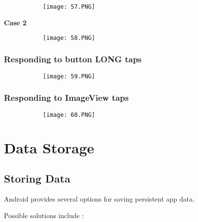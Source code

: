 \documentclass{article}
\begin{document}
  \begin{figure}[ht!]
  \centering
  \begin{subfigure}[b]{0.8\linewidth}
  \texttt{[image: 57.PNG]}
  \end{subfigure}
  \end{figure}

  
  \textbf{Case 2}

    \begin{figure}[ht!]
  \centering
  \begin{subfigure}[b]{0.8\linewidth}
  \texttt{[image: 58.PNG]}
  \end{subfigure}
  \end{figure}

\subsubsection{Responding to button LONG taps}

    \begin{figure}[ht!]
  \centering
  \begin{subfigure}[b]{0.8\linewidth}
  \texttt{[image: 59.PNG]}
  \end{subfigure}
  \end{figure}

  \subsubsection{Responding to ImageView taps}

      \begin{figure}[ht!]
  \centering
  \begin{subfigure}[b]{0.8\linewidth}
  \texttt{[image: 60.PNG]}
  \end{subfigure}
  \end{figure}

  \section{Data Storage}

  \subsection{Storing Data}

  Android provides several options for saving persistent app data.

  Possible solutions include : 
\end{document}
